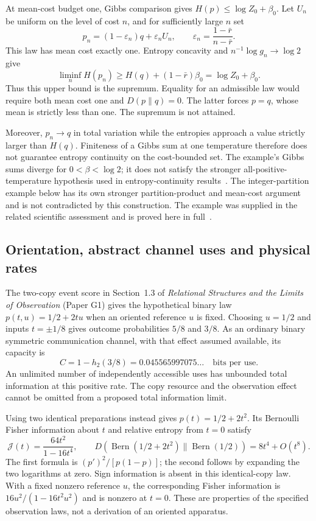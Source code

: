 At mean-cost budget one, Gibbs comparison gives $H(p)\le\log Z_0+\beta_0$. Let $U_n$ be uniform on the level of cost $n$, and for sufficiently large $n$ set
\[
 p_n=(1-\varepsilon_n)q+\varepsilon_nU_n,\qquad
 \varepsilon_n=\frac{1-\bar r}{n-\bar r}.
\]
This law has mean cost exactly one. Entropy concavity and $n^{-1}\log g_n\to\log2$ give
\[
 \liminf_n H(p_n)\ge H(q)+(1-\bar r)\beta_0
 =\log Z_0+\beta_0.
\]
Thus this upper bound is the supremum. Equality for an admissible law would require both mean cost one and $D(p\|q)=0$. The latter forces $p=q$, whose mean is strictly less than one. The supremum is not attained.

Moreover, $p_n\to q$ in total variation while the entropies approach a value strictly larger than $H(q)$. Finiteness of a Gibbs sum at one temperature therefore does not guarantee entropy continuity on the cost-bounded set. The example's Gibbs sums diverge for $0<\beta<\log2$; it does not satisfy the stronger all-positive-temperature hypothesis used in entropy-continuity results~\cite{beckerEntropy}. The integer-partition example below has its own stronger partition-product and mean-cost argument and is not contradicted by this construction. The example was supplied in the related scientific assessment and is proved here in full~\cite{justusAssessment}.

\subsection{Orientation, abstract channel uses and physical rates}
\label{pat:orientation}
The two-copy event score in Section~1.3 of \emph{Relational Structures and the Limits of Observation} (Paper G1) gives the hypothetical binary law $p(t,u)=1/2+2tu$ when an oriented reference $u$ is fixed. Choosing $u=1/2$ and inputs $t=\pm1/8$ gives outcome probabilities $5/8$ and $3/8$. As an ordinary binary symmetric communication channel, with that effect assumed available, its capacity is
\[
 C=1-h_2(3/8)=0.045565997075\ldots\quad\text{bits per use}.
\]
An unlimited number of independently accessible uses has unbounded total information at this positive rate. The copy resource and the observation effect cannot be omitted from a proposed total information limit.

Using two identical preparations instead gives $p(t)=1/2+2t^2$. Its Bernoulli Fisher information about $t$ and relative entropy from $t=0$ satisfy
\[
 \mathcal J(t)=\frac{64t^2}{1-16t^4},\qquad
 D(\operatorname{Bern}(1/2+2t^2)\|
 \operatorname{Bern}(1/2))=8t^4+O(t^8).
\]
The first formula is $(p')^2/[p(1-p)]$; the second follows by expanding the two logarithms at zero. Sign information is absent in this identical-copy law. With a fixed nonzero reference $u$, the corresponding Fisher information is
$16u^2/(1-16t^2u^2)$ and is nonzero at $t=0$. These are properties of the specified observation laws, not a derivation of an oriented apparatus.


